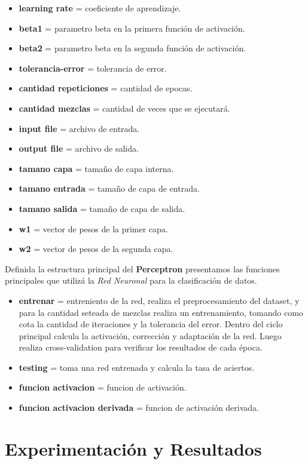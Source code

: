 \documentclass[onecolumn,10pt]{article}
\begin{document}
\begin{itemize}
\item \textbf{learning rate} = coeficiente de aprendizaje.
\item \textbf{beta1} = parametro beta en la primera función de activación.
\item \textbf{beta2} = parametro beta en la segunda función de activación.
\item \textbf{tolerancia-error} = tolerancia de error.
\item \textbf{cantidad repeticiones} = cantidad de epocas.
\item \textbf{cantidad mezclas} = cantidad de veces que se ejecutará.
\item \textbf{input file} = archivo de entrada.
\item \textbf{output file} = archivo de salida.
\item \textbf{tamano capa} = tamaño de capa interna.
\item \textbf{tamano entrada} = tamaño de capa de entrada.
\item \textbf{tamano salida} = tamaño de capa de salida.
\item \textbf{w1} = vector de pesos de la primer capa.
\item \textbf{w2} = vector de pesos de la segunda capa.
\end{itemize}


Definida la estructura principal del \textbf{Perceptron} presentamos
las funciones principales que utilizá la \emph{Red Neuronal} para
la clasificación de datos.


\begin{itemize}
\item \textbf{entrenar} = entreniento de la red, realiza el preprocesamiento
del dataset, y para la cantidad seteada de mezclas realiza un entrenamiento, tomando
como cota la cantidad de iteraciones y la tolerancia del error. Dentro del ciclo principal
calcula la activación, corrección y adaptación de la red. Luego realiza cross-validation para
verificar los resultados de cada época.
\item \textbf{testing} = toma una red entrenada y calcula la tasa de aciertos.
\item \textbf{funcion activacion} = funcion de activación.
\item \textbf{funcion activacion derivada} = funcion de activación derivada.
\end{itemize}


\section{Experimentación y Resultados}
\end{document}
